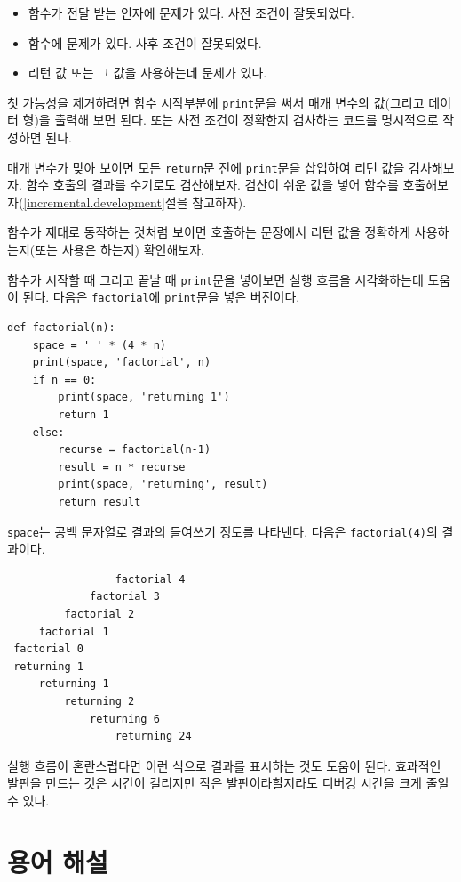 \documentclass[10pt]{book}
\begin{document}
\begin{itemize}

\item 함수가 전달 받는 인자에 문제가 있다. 사전 조건이 잘못되었다. 

\item 함수에 문제가 있다. 사후 조건이 잘못되었다. 

\item 리턴 값 또는 그 값을 사용하는데 문제가 있다. 

\end{itemize}

첫 가능성을 제거하려면 함수 시작부분에 {\tt print}문을 써서 매개 변수의
값(그리고 데이터 형)을 출력해 보면 된다.  또는 사전 조건이 정확한지
검사하는 코드를 명시적으로 작성하면 된다.

매개 변수가 맞아 보이면 모든 {\tt return}문 전에 {\tt print}문을
삽입하여 리턴 값을 검사해보자.  함수 호출의 결과를 수기로도
검산해보자.  검산이 쉬운 값을 넣어 함수를
호출해보자(\ref{incremental.development}절을 참고하자).

함수가 제대로 동작하는 것처럼 보이면 호출하는 문장에서 리턴 값을
정확하게 사용하는지(또는 사용은 하는지) 확인해보자.


함수가 시작할 때 그리고 끝날 때 {\tt print}문을 넣어보면 실행 흐름을
시각화하는데 도움이 된다. 다음은 {\tt factorial}에 {\tt print}문을 넣은
버전이다.

\begin{verbatim}
def factorial(n):
    space = ' ' * (4 * n)
    print(space, 'factorial', n)
    if n == 0:
        print(space, 'returning 1')
        return 1
    else:
        recurse = factorial(n-1)
        result = n * recurse
        print(space, 'returning', result)
        return result
\end{verbatim}
%
{\tt space}는 공백 문자열로 결과의 들여쓰기 정도를 나타낸다. 다음은
{\tt factorial(4)}의 결과이다.

\begin{verbatim}
                 factorial 4
             factorial 3
         factorial 2
     factorial 1
 factorial 0
 returning 1
     returning 1
         returning 2
             returning 6
                 returning 24
\end{verbatim}
%
실행 흐름이 혼란스럽다면 이런 식으로 결과를 표시하는 것도 도움이 된다.
효과적인 발판을 만드는 것은 시간이 걸리지만 작은 발판이라할지라도
디버깅 시간을 크게 줄일 수 있다.


\section{용어 해설}
\end{document}
